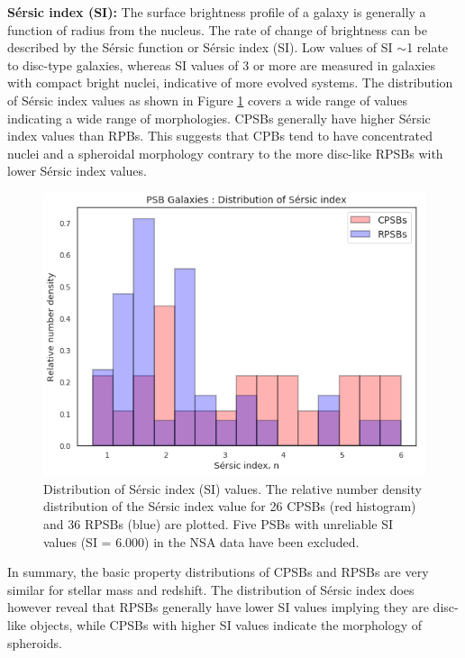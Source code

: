 \textbf{S\'ersic index (SI):} The surface brightness profile of a galaxy is generally a function of radius from the nucleus. The rate of change of brightness can be described by the S\'ersic function or S\'ersic index (SI). Low values of SI $\sim$1 relate to disc-type galaxies, whereas SI values of 3 or more are measured in galaxies with compact bright nuclei, indicative of more evolved systems. The distribution of S\'ersic index values as shown in Figure \ref{fig:Sersic-plot} covers a wide range of values indicating a wide range of morphologies. CPSBs  generally have higher S\'ersic index values than RPBs. This suggests that CPBs tend to have concentrated nuclei and a spheroidal morphology contrary to the more disc-like RPSBs with lower S\'ersic index values.

\begin{figure}
    \centering
    \includegraphics[width=\columnwidth]{images/JupyterPlots/Dist-Sersic-Index-All.png}
    \caption[Comparison of the distribution of S\'ersic index values of CPSBs and RPSBs]{Distribution of S\'ersic index (SI) values. The relative number density distribution of the S\'ersic index value for 26 CPSBs (red histogram) and 36 RPSBs (blue) are plotted. Five PSBs with unreliable SI values (SI = 6.000) in the NSA data  have been excluded.}
    \label{fig:Sersic-plot}
\end{figure}

In summary, the basic property distributions of CPSBs and RPSBs are very similar for stellar mass and redshift. The distribution of S\'ersic index does however reveal that RPSBs generally have lower SI values implying they are disc-like objects, while CPSBs with higher SI values indicate the morphology of spheroids.

